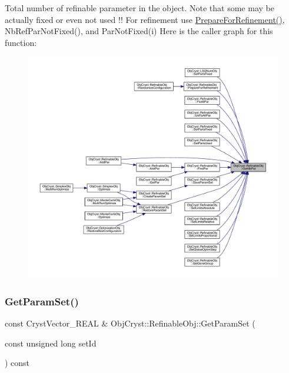 Total number of refinable parameter in the object. Note that some may be actually fixed or even not used !! For refinement use \mbox{\hyperlink{class_obj_cryst_1_1_refinable_obj_a6710a75c0477b6ad7e42400cdc6f1c32}{Prepare\+For\+Refinement()}}, Nb\+Ref\+Par\+Not\+Fixed(), and Par\+Not\+Fixed(i) Here is the caller graph for this function\+:
\nopagebreak
\begin{figure}[H]
\begin{center}
\leavevmode
\includegraphics[width=350pt]{class_obj_cryst_1_1_refinable_obj_a3a45838e4463a17f1d32a892dc48c1dd_icgraph}
\end{center}
\end{figure}
\mbox{\label{class_obj_cryst_1_1_refinable_obj_a8c542c9935105d88c38cc83b7b4dc506}} 
\subsubsection{\texorpdfstring{GetParamSet()}{GetParamSet()}\hspace{0.1cm}{\footnotesize\ttfamily [1/2]}}
{\footnotesize\ttfamily const Cryst\+Vector\+\_\+\+R\+E\+AL \& Obj\+Cryst\+::\+Refinable\+Obj\+::\+Get\+Param\+Set (\begin{DoxyParamCaption}\item[{const unsigned long}]{set\+Id }\end{DoxyParamCaption}) const}



